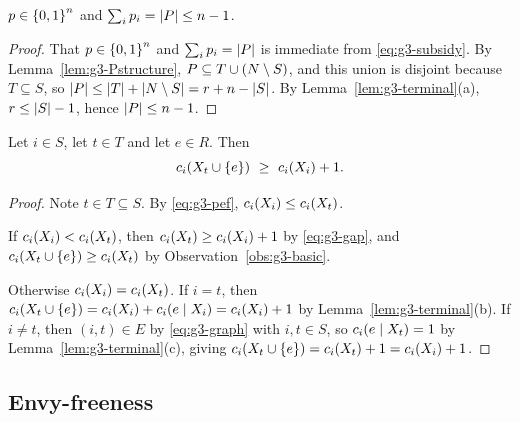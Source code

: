 \begin{lemma}
\label{lem:g3-budget}
$p \in \left\{0,1\right\}^n$ and $\sum_{i} p_i = \left\lvert P\right\rvert \le n-1$.
\end{lemma}
\begin{proof}
That $p \in \left\{0,1\right\}^n$ and $\sum_i p_i = \left\lvert P\right\rvert$ is immediate
from \eqref{eq:g3-subsidy}. By Lemma~\ref{lem:g3-Pstructure},
$P \subseteq T \cup (N \setminus S)$, and this union is disjoint
because $T \subseteq S$, so
$\left\lvert P\right\rvert \le \left\lvert T\right\rvert + \left\lvert N \setminus S\right\rvert = r + n - \left\lvert S\right\rvert$. By
Lemma~\ref{lem:g3-terminal}(a), $r \le \left\lvert S\right\rvert - 1$, hence
$\left\lvert P\right\rvert \le n - 1$.
\end{proof}

\begin{lemma}
\label{lem:g3-expensive}
Let $i \in S$, let $t \in T$ and let $e \in R$. Then
\[
  \cost_i(X_t \cup \set e) \ \ge\ \cost_i(X_i) + 1 .
\]
\end{lemma}
\begin{proof}
Note $t \in T \subseteq S$. By \eqref{eq:g3-pef},
$c_i(X_i) \le c_i(X_t)$.

If $c_i(X_i) < c_i(X_t)$, then $c_i(X_t) \ge c_i(X_i) + 1$ by
\eqref{eq:g3-gap}, and $c_i(X_t \cup \left\{e\right\}) \ge c_i(X_t)$ by
Observation~\ref{obs:g3-basic}.

Otherwise $c_i(X_i) = c_i(X_t)$. If $i = t$, then
$c_i(X_t \cup \left\{e\right\}) = c_i(X_i) + c_i(e \mid X_i) =
c_i(X_i) + 1$ by Lemma~\ref{lem:g3-terminal}(b). If $i \ne t$, then
$(i,t) \in E$ by \eqref{eq:g3-graph} with $i,t \in S$, so
$c_i(e \mid X_t) = 1$ by Lemma~\ref{lem:g3-terminal}(c), giving
$c_i(X_t \cup \left\{e\right\}) = c_i(X_t) + 1 = c_i(X_i) + 1$.
\end{proof}

\subsection{Envy-freeness}
\label{sec:g3-ef}

